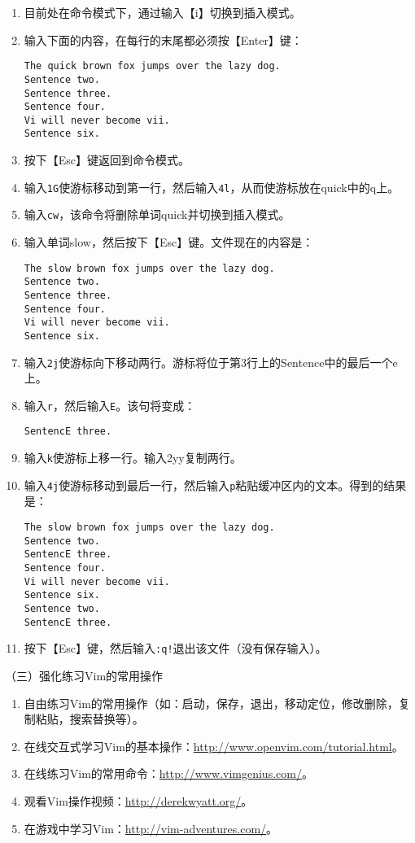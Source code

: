 \begin{enumerate}
\begin{enumerate}
      \item 目前处在命令模式下，通过输入【i】切换到插入模式。
      \item 输入下面的内容，在每行的末尾都必须按【Enter】键：
\begin{verbatim}
The quick brown fox jumps over the lazy dog.
Sentence two.
Sentence three.
Sentence four.
Vi will never become vii.
Sentence six.
\end{verbatim}
      \item 按下【Esc】键返回到命令模式。
      \item 输入\verb|1G|使游标移动到第一行，然后输入\verb|4l|，从而使游标放在quick中的q上。
      \item 输入\verb|cw|，该命令将删除单词quick并切换到插入模式。
      \item 输入单词slow，然后按下【Esc】键。文件现在的内容是：
\begin{verbatim}
The slow brown fox jumps over the lazy dog.
Sentence two.
Sentence three.
Sentence four.
Vi will never become vii.
Sentence six.
\end{verbatim}
      \item 输入\verb|2j|使游标向下移动两行。游标将位于第3行上的Sentence中的最后一个e上。
      \item 输入\verb|r|，然后输入\verb|E|。该句将变成：
\begin{verbatim}
SentencE three.
\end{verbatim}
      \item 输入\verb|k|使游标上移一行。输入2yy复制两行。
      \item 输入\verb|4j|使游标移动到最后一行，然后输入\verb|p|粘贴缓冲区内的文本。得到的结果是：
\begin{verbatim}
The slow brown fox jumps over the lazy dog.
Sentence two.
SentencE three.
Sentence four.
Vi will never become vii.
Sentence six.
Sentence two.
SentencE three.
\end{verbatim}
      \item 按下【Esc】键，然后输入\verb|:q!|退出该文件（没有保存输入）。
    \end{enumerate}
\end{enumerate}

\vspace{0.1in}
（三）强化练习Vim的常用操作
\begin{enumerate}
  \item 自由练习Vim的常用操作（如：启动，保存，退出，移动定位，修改删除，复制粘贴，搜索替换等）。
  \item 在线交互式学习Vim的基本操作：\href{http://www.openvim.com/tutorial.html}{http://www.openvim.com/tutorial.html}。
  \item 在线练习Vim的常用命令：\href{http://www.vimgenius.com/}{http://www.vimgenius.com/}。
  \item 观看Vim操作视频：\href{http://derekwyatt.org/}{http://derekwyatt.org/}。
  \item 在游戏中学习Vim：\href{http://vim-adventures.com/}{http://vim-adventures.com/}。
\end{enumerate}

